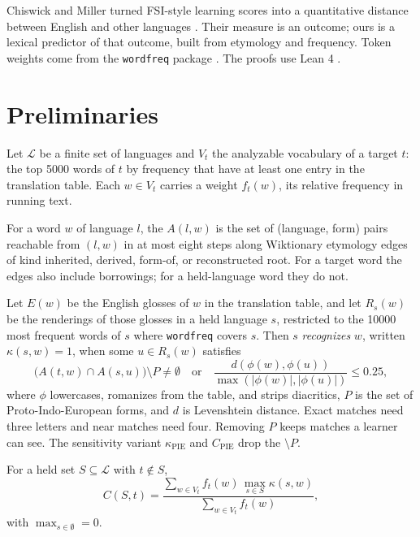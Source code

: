 \documentclass[11pt]{article}
\begin{document}
Chiswick and Miller turned FSI-style learning scores into a quantitative
distance between English and other languages \cite{chiswick2005distance}.
Their measure is an outcome; ours is a lexical predictor of that outcome,
built from etymology and frequency. Token weights come from the
\texttt{wordfreq} package \cite{speer2018wordfreq}. The proofs use Lean 4
\cite{demoura2021lean4}.

\section{Preliminaries}
\label{sec:prelim}

Let $\mathcal{L}$ be a finite set of languages and $V_t$ the analyzable
vocabulary of a target $t$: the top 5000 words of $t$ by frequency that
have at least one entry in the translation table. Each $w\in V_t$ carries
a weight $f_t(w)$, its relative frequency in running text.

\begin{definition}
\label{def:closure}
For a word $w$ of language $l$, the 
$A(l,w)$ is the set of (language, form) pairs reachable from $(l,w)$ in at
most eight steps along Wiktionary etymology edges of kind inherited,
derived, form-of, or reconstructed root. For a target word the edges also
include borrowings; for a held-language word they do not.
\end{definition}

\begin{definition}[Recognition]
\label{def:recognition}
Let $E(w)$ be the English glosses of $w$ in the translation table, and
let $R_s(w)$ be the renderings of those glosses in a held language $s$,
restricted to the 10000 most frequent words of $s$ where \texttt{wordfreq}
covers $s$. Then $s$ \emph{recognizes} $w$, written $\kappa(s,w)=1$, when
some $u\in R_s(w)$ satisfies
\[
  \bigl(A(t,w)\cap A(s,u)\bigr)\setminus P\neq\emptyset
  \quad\text{or}\quad
  \frac{d(\phi(w),\phi(u))}{\max(|\phi(w)|,|\phi(u)|)}\le 0.25,
\]
where $\phi$ lowercases, romanizes from the table, and strips diacritics,
$P$ is the set of Proto-Indo-European forms, and $d$ is Levenshtein
distance. Exact matches need three letters and near matches need four.
Removing $P$ keeps matches a learner can see. The sensitivity variant
$\kappa_{\mathrm{PIE}}$ and $C_{\mathrm{PIE}}$ drop the $\setminus P$.
\end{definition}

\begin{definition}
\label{def:coverage}
For a held set $S\subseteq\mathcal{L}$ with $t\notin S$,
\[
  C(S,t)=\frac{\sum_{w\in V_t} f_t(w)\,\max_{s\in S}\kappa(s,w)}
              {\sum_{w\in V_t} f_t(w)},
\]
with $\max_{s\in\emptyset}=0$.
\end{definition}
\end{document}
